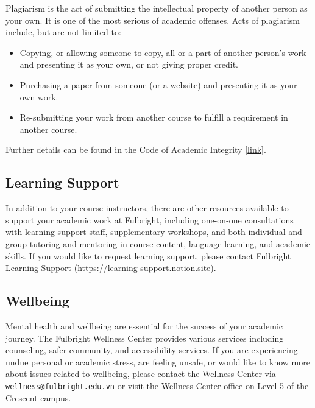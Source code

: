 \documentclass[
]{article}
\begin{document}
Plagiarism is the act of submitting the intellectual property of another person as your own. It is one of the most serious of academic offenses. Acts of plagiarism include, but are not limited to:

\begin{itemize}
\item
  Copying, or allowing someone to copy, all or a part of another person's work and presenting it as your own, or not giving proper credit.
\item
  Purchasing a paper from someone (or a website) and presenting it as your own work.
\item
  Re-submitting your work from another course to fulfill a requirement in another course.
\end{itemize}

Further details can be found in the Code of Academic Integrity {[}\href{https://fulbright.edu.vn/articles/Code\%20of\%20Academic\%20Integrity/Code\%20of\%20Academic\%20Integrity_\%20Excom\%20Endorsed.pdf}{link}{]}.

\hypertarget{learning-support}{%
\subsection*{Learning Support}\label{learning-support}}

In addition to your course instructors, there are other resources available to support your
academic work at Fulbright, including one-on-one consultations with learning support staff,
supplementary workshops, and both individual and group tutoring and mentoring in course
content, language learning, and academic skills. If you would like to request learning support,
please contact Fulbright Learning Support (\url{https://learning-support.notion.site}).

\hypertarget{wellbeing}{%
\subsection*{Wellbeing}\label{wellbeing}}

Mental health and wellbeing are essential for the success of your academic journey. The
Fulbright Wellness Center provides various services including counseling, safer community,
and accessibility services. If you are experiencing undue personal or academic stress, are
feeling unsafe, or would like to know more about issues related to wellbeing, please contact
the Wellness Center via \href{mailto:wellness@fulbright.edu.vn}{\nolinkurl{wellness@fulbright.edu.vn}} or visit the Wellness Center office on
Level 5 of the Crescent campus.
\end{document}
